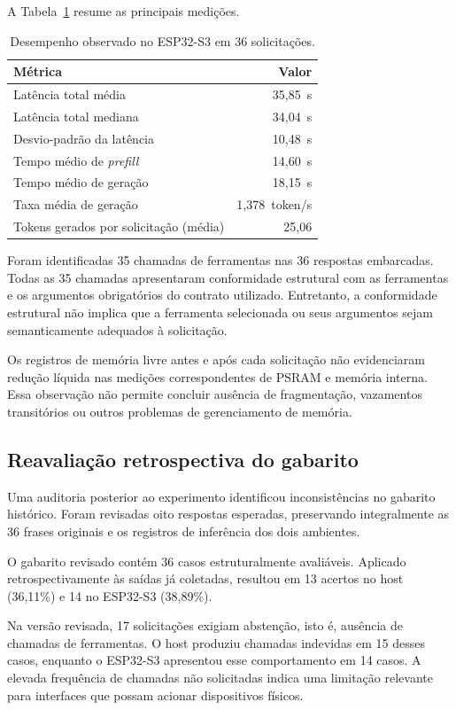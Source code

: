 \documentclass[12pt]{article}
\begin{document}
A Tabela~\ref{tab:desempenho_esp32}
resume as principais medições.

\begin{table}[ht]
\centering
\caption{Desempenho observado no ESP32-S3
em 36 solicitações.}
\label{tab:desempenho_esp32}
\begin{tabular}{lr}
\toprule
Métrica & Valor \\
\midrule
Latência total média & 35,85~s \\
Latência total mediana & 34,04~s \\
Desvio-padrão da latência & 10,48~s \\
Tempo médio de \textit{prefill} & 14,60~s \\
Tempo médio de geração & 18,15~s \\
Taxa média de geração & 1,378~token/s \\
Tokens gerados por solicitação (média) & 25,06 \\
\bottomrule
\end{tabular}
\end{table}

Foram identificadas 35 chamadas de ferramentas
nas 36 respostas embarcadas. Todas as 35
chamadas apresentaram conformidade estrutural
com as ferramentas e os argumentos obrigatórios
do contrato utilizado. Entretanto, a
conformidade estrutural não implica que a
ferramenta selecionada ou seus argumentos
sejam semanticamente adequados à solicitação.

Os registros de memória livre antes e após
cada solicitação não evidenciaram redução
líquida nas medições correspondentes de PSRAM
e memória interna. Essa observação não
permite concluir ausência de fragmentação,
vazamentos transitórios ou outros problemas
de gerenciamento de memória.

\subsection{Reavaliação retrospectiva do gabarito}

Uma auditoria posterior ao experimento
identificou inconsistências no gabarito
histórico. Foram revisadas oito respostas
esperadas, preservando integralmente as
36 frases originais e os registros de
inferência dos dois ambientes.

O gabarito revisado contém 36 casos
estruturalmente avaliáveis. Aplicado
retrospectivamente às saídas já coletadas,
resultou em 13 acertos no host
(36,11\%) e 14 no ESP32-S3
(38,89\%).

Na versão revisada, 17 solicitações
exigiam abstenção, isto é, ausência de
chamadas de ferramentas. O host produziu
chamadas indevidas em 15 desses casos,
enquanto o ESP32-S3 apresentou esse
comportamento em 14 casos. A elevada
frequência de chamadas não solicitadas
indica uma limitação relevante para
interfaces que possam acionar dispositivos
físicos.
\end{document}
